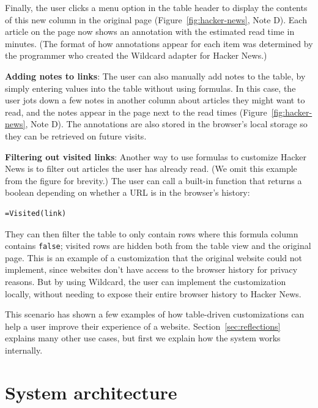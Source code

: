 \documentclass[sigplan,screen,10pt,anonymous,review]{acmart}
\begin{document}
Finally, the user clicks a menu option in the table header to display
the contents of this new column in the original page
(Figure~\ref{fig:hacker-news}, Note D). Each article on the page now
shows an annotation with the estimated read time in minutes. (The format
of how annotations appear for each item was determined by the programmer
who created the Wildcard adapter for Hacker News.)

\textbf{Adding notes to links}: The user can also manually add notes to
the table, by simply entering values into the table without using
formulas. In this case, the user jots down a few notes in another column
about articles they might want to read, and the notes appear in the page
next to the read times (Figure~\ref{fig:hacker-news}, Note D). The
annotations are also stored in the browser's local storage so they can
be retrieved on future visits.

\textbf{Filtering out visited links}: Another way to use formulas to
customize Hacker News is to filter out articles the user has already
read. (We omit this example from the figure for brevity.) The user can
call a built-in function that returns a boolean depending on whether a
URL is in the browser's history:

\begin{verbatim}
=Visited(link)
\end{verbatim}

They can then filter the table to only contain rows where this formula
column contains \texttt{false}; visited rows are hidden both from the
table view and the original page. This is an example of a customization
that the original website could not implement, since websites don't have
access to the browser history for privacy reasons. But by using
Wildcard, the user can implement the customization locally, without
needing to expose their entire browser history to Hacker News.

This scenario has shown a few examples of how table-driven
customizations can help a user improve their experience of a website.
Section~\ref{sec:reflections} explains many other use cases, but first
we explain how the system works internally.

\hypertarget{sec:architecture}{%
\section{System architecture}\label{sec:architecture}}
\end{document}
